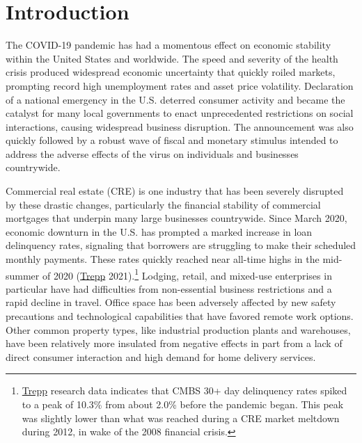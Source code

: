 \documentclass[11pt]{article} %
\begin{document}
\newpage
\thispagestyle{empty}
\tableofcontents
\vspace{3.5em}
\listoftables
\thispagestyle{empty}
\newpage


\hypersetup{
    colorlinks=true,
    linkcolor=MidnightBlue, %
    filecolor=magenta,      %
    urlcolor=Purple,        %
    citecolor=MidnightBlue, %
}

\noindent 
\normalsize

\section{Introduction}

The COVID-19 pandemic has had a momentous effect on economic stability within the United States and worldwide. The speed and severity of the health crisis produced widespread economic uncertainty that quickly roiled markets, prompting record high unemployment rates and asset price volatility. Declaration of a national emergency in the U.S. deterred consumer activity and became the catalyst for many local governments to enact unprecedented restrictions on social interactions, causing widespread business disruption. The announcement was also quickly followed by a robust wave of fiscal and monetary stimulus intended to address the adverse effects of the virus on individuals and businesses countrywide. 

Commercial real estate (CRE) is one industry that has been severely disrupted by these drastic changes, particularly the financial stability of commercial mortgages that underpin many large businesses countrywide. Since March 2020, economic downturn in the U.S. has prompted a marked increase in loan delinquency rates, signaling that borrowers are struggling to make their scheduled monthly payments. These rates quickly reached near all-time highs in the mid-summer of 2020 (\hyperlink{Trepp}{Trepp} 2021).\footnote{\href{https://www.trepp.com/}{Trepp} research data indicates that CMBS 30+ day delinquency rates spiked to a peak of 10.3\% from about 2.0\% before the pandemic began. This peak was slightly lower than what was reached during a CRE market meltdown during 2012, in wake of the 2008 financial crisis.} Lodging, retail, and mixed-use enterprises in particular have had difficulties from non-essential business restrictions and a rapid decline in travel. Office space has been adversely affected by new safety precautions and technological capabilities that have favored remote work options. Other common property types, like industrial production plants and warehouses, have been relatively more insulated from negative effects in part from a lack of direct consumer interaction and high demand for home delivery services.  
\end{document}
